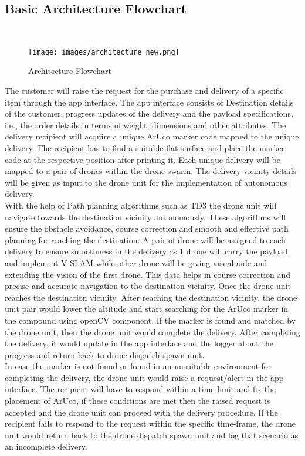 \documentclass[preprint,12pt]{elsarticle}
\begin{document}
\subsection{Basic Architecture Flowchart}\\

\begin{figure}[!htbp]
    \centering
    \texttt{[image: images/architecture\_new.png]}
    \caption{Architecture Flowchart}
\end{figure}

The customer will raise the request for the purchase and delivery of a specific item through the app interface. The app interface consists of Destination details of the customer, progress updates of the delivery and the payload specifications, i.e., the order details in terms of weight, dimensions and other attributes. The delivery recipient will acquire a unique ArUco marker code mapped to the unique delivery. The recipient has to find a suitable flat surface and place the marker code at the respective position after printing it. Each unique delivery will be mapped to a pair of drones within the drone swarm. The delivery vicinity details will be given as input to the drone unit for the implementation of autonomous delivery.\\
With the help of Path planning algorithms such as TD3 the drone unit will navigate towards the destination vicinity autonomously. These algorithms will ensure the obstacle avoidance, course correction and smooth and effective path planning for reaching the destination. A pair of drone will be assigned to each delivery to ensure smoothness in the delivery as 1 drone will carry the payload and implement V-SLAM while other drone will be giving visual aide and extending the vision of the first drone. This data helps in course correction and precise and accurate navigation to the destination vicinity. Once the drone unit reaches the destination vicinity. After reaching the destination vicinity, the drone unit pair would lower the altitude and start searching for the ArUco marker in the compound using openCV component. If the marker is found and matched by the drone unit, then the drone unit would complete the delivery. After completing the delivery, it would update in the app interface and the logger about the progress and return back to drone dispatch spawn unit. \\
In case the marker is not found or found in an unsuitable environment for completing the delivery, the drone unit would raise a request/alert in the app interface. The recipient will have to respond within a time limit and fix the placement of ArUco, if these conditions are met then the raised request is accepted and the drone unit can proceed with the delivery procedure. If the recipient fails to respond to the request within the specific time-frame, the drone unit would return back to the drone dispatch spawn unit and log that scenario as an incomplete delivery.
\end{document}
